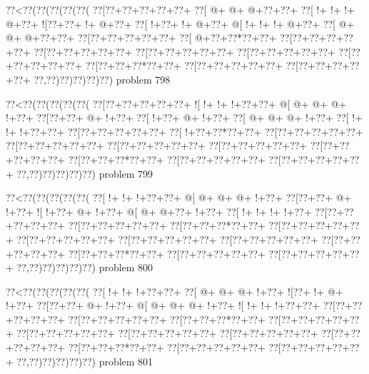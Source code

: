 \vbox{\vbox{\goo
\0??<\0??(\0??(\0??(\0??(\0??(
\0??[\0??+\0??+\0??+\0??+\0??+
\0??[\- @+\- @+\- @+\0??+\0??+
\0??[\- !+\- !+\- !+\- @+\0??+
\- ![\0??+\0??+\- !+\- @+\0??+
\0??[\- !+\0??+\- !+\- @+\0??+
\- @[\- !+\- !+\- !+\- @+\0??+
\0??[\- @+\- @+\- @+\0??+\0??+
\0??[\0??+\0??+\0??+\0??+\0??+
\0??[\- @+\0??+\0??*\0??+\0??+
\0??[\0??+\0??+\0??+\0??+\0??+
\0??[\0??+\0??+\0??+\0??+\0??+
\0??[\0??+\0??+\0??+\0??+\0??+
\0??[\0??+\0??+\0??+\0??+\0??+
\0??[\0??+\0??+\0??+\0??+\0??+
\0??[\0??+\0??+\0??*\0??+\0??+
\0??[\0??+\0??+\0??+\0??+\0??+
\0??[\0??+\0??+\0??+\0??+\0??+
\0??,\0??)\0??)\0??)\0??)\0??)
}
\hfil problem 798\hfil\break
}

\vbox{\vbox{\goo
\0??<\0??(\0??(\0??(\0??(\0??(
\0??[\0??+\0??+\0??+\0??+\0??+
\- ![\- !+\- !+\- !+\0??+\0??+
\- @[\- @+\- @+\- @+\- !+\0??+
\0??[\0??+\0??+\- @+\- !+\0??+
\0??[\- !+\0??+\- @+\- !+\0??+
\0??[\- @+\- @+\- @+\- !+\0??+
\0??[\- !+\- !+\- !+\0??+\0??+
\0??[\0??+\0??+\0??+\0??+\0??+
\0??[\- !+\0??+\0??*\0??+\0??+
\0??[\0??+\0??+\0??+\0??+\0??+
\0??[\0??+\0??+\0??+\0??+\0??+
\0??[\0??+\0??+\0??+\0??+\0??+
\0??[\0??+\0??+\0??+\0??+\0??+
\0??[\0??+\0??+\0??+\0??+\0??+
\0??[\0??+\0??+\0??*\0??+\0??+
\0??[\0??+\0??+\0??+\0??+\0??+
\0??[\0??+\0??+\0??+\0??+\0??+
\0??,\0??)\0??)\0??)\0??)\0??)
}
\hfil problem 799\hfil\break
}

\vbox{\vbox{\goo
\0??<\0??(\0??(\0??(\0??(\0??(
\0??[\- !+\- !+\- !+\0??+\0??+
\- @[\- @+\- @+\- @+\- !+\0??+
\0??[\0??+\0??+\- @+\- !+\0??+
\- ![\- !+\0??+\- @+\- !+\0??+
\- @[\- @+\- @+\0??+\- !+\0??+
\0??[\- !+\- !+\- !+\- !+\0??+
\0??[\0??+\0??+\0??+\0??+\0??+
\0??[\0??+\0??+\0??+\0??+\0??+
\0??[\0??+\0??+\0??*\0??+\0??+
\0??[\0??+\0??+\0??+\0??+\0??+
\0??[\0??+\0??+\0??+\0??+\0??+
\0??[\0??+\0??+\0??+\0??+\0??+
\0??[\0??+\0??+\0??+\0??+\0??+
\0??[\0??+\0??+\0??+\0??+\0??+
\0??[\0??+\0??+\0??*\0??+\0??+
\0??[\0??+\0??+\0??+\0??+\0??+
\0??[\0??+\0??+\0??+\0??+\0??+
\0??,\0??)\0??)\0??)\0??)\0??)
}
\hfil problem 800\hfil\break
}

\vbox{\vbox{\goo
\0??<\0??(\0??(\0??(\0??(\0??(
\0??[\- !+\- !+\- !+\0??+\0??+
\0??[\- @+\- @+\- @+\- !+\0??+
\- ![\0??+\- !+\- @+\- !+\0??+
\0??[\0??+\0??+\- @+\- !+\0??+
\- @[\- @+\- @+\- @+\- !+\0??+
\- ![\- !+\- !+\- !+\0??+\0??+
\0??[\0??+\0??+\0??+\0??+\0??+
\0??[\0??+\0??+\0??+\0??+\0??+
\0??[\0??+\0??+\0??*\0??+\0??+
\0??[\0??+\0??+\0??+\0??+\0??+
\0??[\0??+\0??+\0??+\0??+\0??+
\0??[\0??+\0??+\0??+\0??+\0??+
\0??[\0??+\0??+\0??+\0??+\0??+
\0??[\0??+\0??+\0??+\0??+\0??+
\0??[\0??+\0??+\0??*\0??+\0??+
\0??[\0??+\0??+\0??+\0??+\0??+
\0??[\0??+\0??+\0??+\0??+\0??+
\0??,\0??)\0??)\0??)\0??)\0??)
}
\hfil problem 801\hfil\break
}

